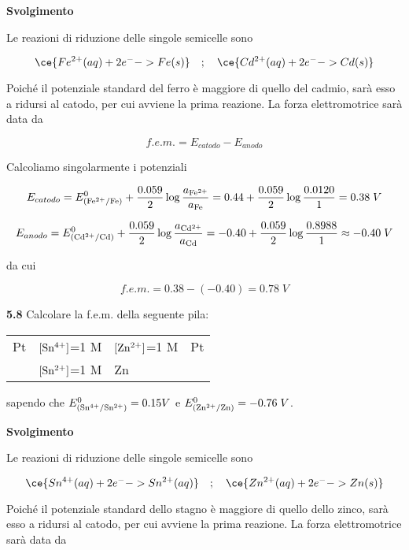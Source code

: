 \vspace{0.2cm}\large\textbf{Svolgimento}\normalsize

\vspace{0.2cm}Le reazioni di riduzione delle singole semicelle sono

$$\ce{Fe^{2+}(aq) + 2 e^- -> Fe(s)}
\quad;\quad
\ce{Cd^{2+}(aq) + 2 e^- -> Cd(s)}$$

Poiché il potenziale standard del ferro è maggiore di quello del cadmio, sarà esso a ridursi al catodo, per cui avviene la prima reazione. La forza elettromotrice sarà data da

$$f.e.m. = E_{catodo} - E_{anodo}$$

Calcoliamo singolarmente i potenziali

$$E_{catodo}
=E^0_{(\rm Fe^{2+}/Fe)} + \frac{0.059}{2} \log \frac{a_{\rm Fe^{2+}}}{a_{\rm Fe}}
=0.44 + \frac{0.059}{2} \log \frac{0.0120}{1}
=0.38\;V$$

$$E_{anodo} = E^0_{(\rm Cd^{2+}/Cd)} + \frac{0.059}{2} \log \frac{a_{\rm Cd^{2+}}}{a_{\rm Cd}}
=-0.40 + \frac{0.059}{2} \log \frac{0.8988}{1}
\approx -0.40\;V$$

da cui

$$f.e.m.=0.38 - (-0.40) = 0.78\;V$$

\vspace{0.2cm}\textbf{5.8} Calcolare la f.e.m. della seguente pila:

\begin{center}
    \begin{tabular}{p{0.6cm}|p{3cm}||p{3cm}|p{1cm}}
        Pt & $[\rm Sn^{4+}]$=1 M & $[\rm Zn^{2+}]$=1 M & Pt\\[0.5ex]
        & $[\rm Sn^{2+}]$=1 M & Zn &\\[0.5ex]
    \end{tabular}
\end{center}

sapendo che $E^0_{(\rm Sn^{4+}/Sn^{2+})}=0.15V$ e $E^0_{(\rm Zn^{2+}/Zn)}=-0.76\;V$.

\vspace{0.2cm}\large\textbf{Svolgimento}\normalsize

\vspace{0.2cm}Le reazioni di riduzione delle singole semicelle sono

$$\ce{Sn^{4+}(aq) + 2 e^- -> Sn^{2+}(aq)}
\quad;\quad
\ce{Zn^{2+}(aq) + 2 e^- -> Zn(s)}$$

Poiché il potenziale standard dello stagno è maggiore di quello dello zinco, sarà esso a ridursi al catodo, per cui avviene la prima reazione. La forza elettromotrice sarà data da

